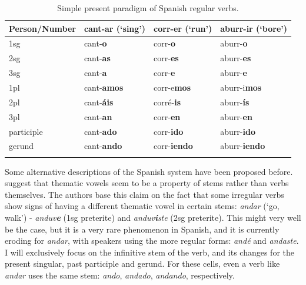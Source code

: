 \begin{table}[!htpb]
  \centering
  \begin{tabular}{llll}
    \lsptoprule
    Person/Number & cant-ar (`sing') & corr-er (`run')     & aburr-ir (`bore')    \\
    \midrule
    1sg           & cant-\textbf{o}           & corr-\textbf{o}     & aburr-\textbf{o}     \\
    2sg           & cant-\textbf{as}          & corr-\textbf{es}    & aburr-\textbf{es}    \\
    3sg           & cant-\textbf{a}           & corr-\textbf{e}     & aburr-\textbf{e}     \\
    1pl           & cant-\textbf{amos}        & corr-e\textbf{mos}  & aburr-i\textbf{mos}  \\
    2pl           & cant-\textbf{áis}         & corré-\textbf{is}   & aburr-\textbf{ís}    \\
    3pl           & cant-\textbf{an}          & corr-\textbf{en}    & aburr-\textbf{en}    \\
    participle    & cant-\textbf{ado}         & corr-\textbf{ido}   & aburr-\textbf{ido}   \\
    gerund        & cant-\textbf{ando}        & corr-\textbf{iendo} & aburr-\textbf{iendo} \\
    \lspbottomrule
  \end{tabular}\caption{Simple present paradigm of Spanish regular verbs.}\label{tab:sp-verb-paradigm}
\end{table}

Some alternative descriptions of the Spanish system have been proposed before. \textcite{Boye.2006} suggest that thematic vowels seem to be a property of stems rather than verbs themselves. The authors base this claim on the fact that some irregular verbs show signs of having a different thematic vowel in certain stems: \textit{andar} (`go, walk') - \textit{anduv\textbf{e}} (1sg preterite) and \textit{anduv\textbf{i}ste} (2sg preterite). This might very well be the case, but it is a very  rare phenomenon in Spanish, and it is currently eroding for \textit{andar}, with speakers using the more regular forms: \textit{andé} and \textit{andaste}. I will exclusively focus on the infinitive stem of the verb, and its changes for the present singular, past participle and gerund. For these cells, even a verb like \textit{andar} uses the same stem: \textit{ando}, \textit{andado}, \textit{andando}, respectively.

